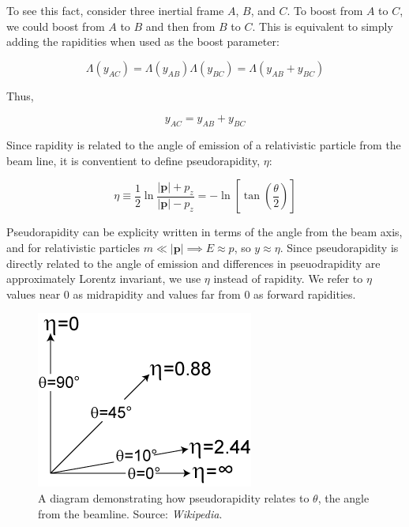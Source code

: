 \documentclass[../main.tex]{subfiles}
\begin{document}
To see this fact, consider three inertial frame $A$, $B$, and $C$. To boost from $A$ to $C$, we could boost from $A$ to $B$ and then from $B$ to $C$. This is equivalent to simply adding the rapidities when used as the boost parameter:

\begin{equation}
    \Lambda({y_{AC}}) = \Lambda (y_{AB}) \Lambda(y_{BC}) = \Lambda(y_{AB} + y_{BC})  
\end{equation}

Thus, 

\begin{equation}
    y_{AC} = y_{AB} + y_{BC}  
\end{equation}

Since rapidity is related to the angle of emission of a relativistic particle from the beam line, it is conventient to define pseudorapidity, $\eta$: 

\begin{equation}
    \eta \equiv \frac{1}{2} \ln{\frac{|\mathbf{p}| + p_z}{|\mathbf{p}| - p_z}} = - \ln{ \left[  \tan{\left( \frac{\theta}{2}  \right)} \right]}
\end{equation}

Pseudorapidity can be explicity written in terms of the angle from the beam axis, and for relativistic particles $m \ll |\mathbf{p}| \implies E \approx p$, so $y \approx \eta$. Since pseudorapidity is directly related to the angle of emission and differences in pseuodrapidity are approximately Lorentz invariant, we use $\eta$ instead of rapidity. We refer to $\eta$ values near $0$ as midrapidity and values far from $0$ as forward rapidities. 

\begin{figure}[h]
    \centering
    \includegraphics[scale=0.5]{introduction/figs/pseudorapid.png}
    \caption{A diagram demonstrating how pseudorapidity relates to $\theta$, the angle from the beamline. Source: \textit{Wikipedia}.}
    \label{fig:pseudorapid}
\end{figure}
\end{document}
